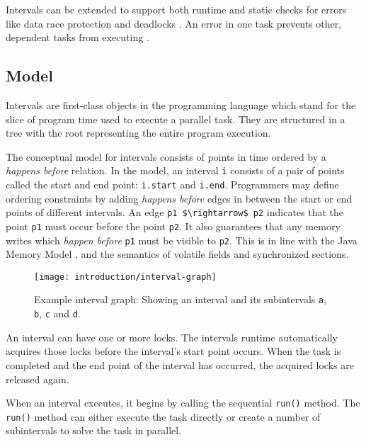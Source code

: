 Intervals can be extended to support both runtime and static checks
for errors like data race protection \cite{Matsakis2010b} and
deadlocks \cite{Matsakis2009}. An error in one task prevents other,
dependent tasks from executing \cite{Matsakis2010a}.

\subsection{Model}
\label{sec:intro-intervals-model}

Intervals are first-class objects in the programming language which
stand for the slice of program time used to execute a parallel task.
They are structured in a tree with the root representing the entire
program execution.

The conceptual model for intervals consists of points in time ordered
by a \emph{happens before} relation. In the model, an interval
\lstinline!i! consists of a pair of points called the start and end
point: \lstinline!i.start! and \lstinline!i.end!. Programmers may
define ordering constraints by adding \emph{happens before} edges in
between the start or end points of different intervals. An edge
\lstinline!p1 $\rightarrow$ p2! indicates that the point
\lstinline!p1! must occur before the point \lstinline!p2!. It also
guarantees that any memory writes which \emph{happen before}
\lstinline!p1! must be visible to \lstinline!p2!. This is in line with
the Java Memory Model \cite{Manson2005}, and the semantics of volatile
fields and synchronized sections.

\begin{figure}[htb]
  \centering
  \texttt{[image: introduction/interval-graph]}
  \caption[Example interval graph]{Example interval graph: Showing an
    interval and its subintervals \lstinline!a!, \lstinline!b!,
    \lstinline!c! and \lstinline!d!.}
  \label{fig:introduction-interval-graph}
\end{figure}

An interval can have one or more locks. The intervals runtime
automatically acquires those locks before the interval's start point
occurs. When the task is completed and the end point of the interval
has occurred, the acquired locks are released again.

When an interval executes, it begins by calling the sequential
\lstinline!run()! method. The \lstinline!run()! method can either
execute the task directly or create a number of subintervals to solve
the task in parallel.

